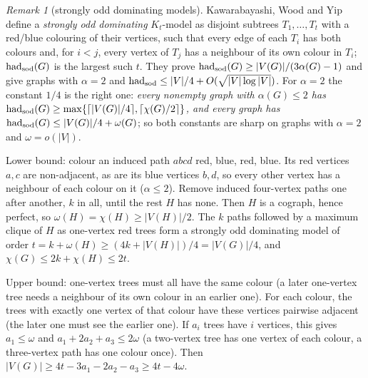 \documentclass[11pt]{article}
\theoremstyle{definition}\newtheorem{conjecture}[theorem]{Conjecture}
\theoremstyle{remark}\newtheorem{remark}[theorem]{Remark}
\begin{document}
\begin{remark}[strongly odd dominating models]\label{r:sod}
Kawarabayashi, Wood and Yip \cite{KWY} define a \emph{strongly odd dominating} $K_t$-model as disjoint subtrees
$T_1,\dots,T_t$ with a red/blue colouring of their vertices, such that every edge of each $T_i$ has both colours and, for
$i<j$, every vertex of $T_j$ has a neighbour of its own colour in $T_i$; $\mathrm{had}_{\rm sod}(G)$ is the largest such $t$.
They prove $\mathrm{had}_{\rm sod}(G)\ge|V(G)|/(3\alpha(G)-1)$ and give graphs with $\alpha=2$ and
$\mathrm{had}_{\rm sod}\le|V|/4+O(\sqrt{|V|\log|V|})$. For $\alpha=2$ the constant $1/4$ is the right one:
\emph{every nonempty graph with $\alpha(G)\le2$ has $\mathrm{had}_{\rm sod}(G)\ge\max\{\lceil|V(G)|/4\rceil,
\lceil\chi(G)/2\rceil\}$, and every graph has $\mathrm{had}_{\rm sod}(G)\le|V(G)|/4+\omega(G)$}; so both constants are
sharp on graphs with $\alpha=2$ and $\omega=o(|V|)$.

Lower bound: colour an induced path $abcd$ red, blue, red, blue. Its red vertices $a,c$ are non-adjacent, as are its blue
vertices $b,d$, so every other vertex has a neighbour of each colour on it ($\alpha\le2$). Remove induced four-vertex paths
one after another, $k$ in all, until the rest $H$ has none. Then $H$ is a cograph, hence perfect, so
$\omega(H)=\chi(H)\ge|V(H)|/2$. The $k$ paths followed by a maximum clique of $H$ as one-vertex red trees form a strongly odd
dominating model of order $t=k+\omega(H)\ge(4k+|V(H)|)/4=|V(G)|/4$, and $\chi(G)\le2k+\chi(H)\le2t$.

Upper bound: one-vertex trees must all have the same colour (a later one-vertex tree needs a neighbour of its own colour in
an earlier one). For each colour, the trees with exactly one vertex of that colour have these vertices pairwise adjacent
(the later one must see the earlier one). If $a_i$ trees have $i$ vertices, this gives $a_1\le\omega$ and
$a_1+2a_2+a_3\le2\omega$ (a two-vertex tree has one vertex of each colour, a three-vertex path has one colour once). Then
$|V(G)|\ge4t-3a_1-2a_2-a_3\ge4t-4\omega$.
\end{remark}
\end{document}
